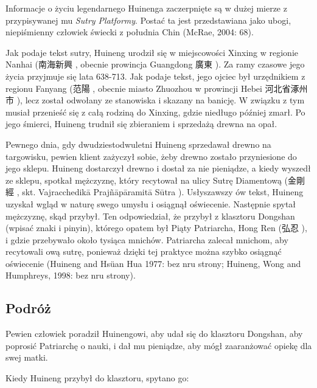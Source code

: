 Informacje o życiu legendarnego Huinenga zaczerpnięte są w dużej mierze z przypisywanej mu \emph{Sutry Platformy}. Postać ta jest przedstawiana jako ubogi, niepiśmienny człowiek świecki z południa Chin (McRae, 2004: 68).

Jak podaje tekst sutry, Huineng urodził się w miejscowości Xinxing w regionie Nanhai (南海新興 , obecnie prowincja Guangdong 廣東 ). Za ramy czasowe jego życia przyjmuje się lata 638-713.
Jak podaje tekst, jego ojciec był urzędnikiem z regionu Fanyang (范陽 , obecnie miasto Zhuozhou w prowincji Hebei 河北省涿州市 ), lecz został odwołany ze stanowiska i skazany na banicję. W związku z tym musiał przenieść się z całą rodziną do Xinxing, gdzie niedługo później zmarł. Po jego śmierci, Huineng trudnił się zbieraniem i sprzedażą drewna na opał.

Pewnego dnia, gdy dwudziestodwuletni Huineng sprzedawał drewno na targowisku, pewien klient zażyczył sobie, żeby drewno zostało przyniesione do jego sklepu. Huineng dostarczył drewno i dostał za nie pieniądze, a kiedy wyszedł ze sklepu, spotkał mężczyznę, który recytował na ulicy Sutrę Diamentową (金剛經 , skt. Vajracchedikā Prajñāpāramitā Sūtra%
). Usłyszawszy ów tekst, Huineng uzyskał wgląd w naturę swego umysłu i osiągnął oświecenie. Następnie spytał mężczyznę, skąd przybył. Ten odpowiedział, że przybył z klasztoru Dongshan (wpisać znaki i pinyin), którego opatem był Piąty Patriarcha, Hong Ren (弘忍 ), i gdzie przebywało około tysiąca mnichów. Patriarcha zalecał mnichom, aby recytowali ową sutrę, ponieważ dzięki tej praktyce można szybko osiągnąć oświecenie (Huineng and Hsüan Hua 1977: bez nru strony; Huineng, Wong and Humphreys, 1998: bez nru strony).

\subsection{Podróż}
Pewien człowiek poradził Huinengowi, aby udał się do klasztoru Dongshan, aby poprosić Patriarchę o nauki, i dał mu pieniądze, aby mógł zaaranżować opiekę dla swej matki.

Kiedy Huineng przybył do klasztoru, spytano go:

